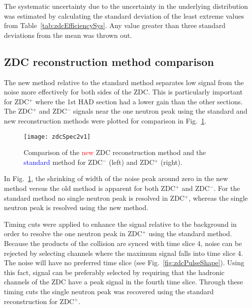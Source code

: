       The systematic uncertainty due to the uncertainty in the 
        underlying distribution was estimated by calculating the standard 
        deviation of the least extreme values from 
        Table~\ref{tab:zdcEfficiencySys}.
      Any value greater than three standard deviations from the mean was thrown
        out. 

    \subsection{ZDC reconstruction method comparison}
      The new method relative to the standard method separates low signal from 
        the noise more effectively for both sides of the ZDC.
      This is particularly important for ZDC$^{+}$ where the 1st HAD section
        had a lower gain than the other sections. 
      The ZDC$^{+}$ and ZDC$^{-}$ signals near the one neutron peak using the
        standard and new reconstruction methods were plotted for comparison in 
        Fig.~\ref{fig:zdcSpec2v1}.
      \begin{figure}[h]
        \centering
        \texttt{[image: zdcSpec2v1]}
        \caption{Comparison of the \textcolor{red}{new} ZDC reconstruction 
          method and the \textcolor{blue}{standard} method for ZDC$^{-}$ (left) and 
          ZDC$^{+}$ (right).}
        \label{fig:zdcSpec2v1}
      \end{figure}
      In Fig.~\ref{fig:zdcSpec2v1}, the shrinking of width of the noise peak 
        around zero in the new method versus the old method is apparent for
        both ZDC$^{+}$ and ZDC$^{-}$.
      For the standard method no single neutron peak is resolved in ZDC$^{+}$,
        whereas the single neutron peak is resolved using the new method. 

      Timing cuts were applied to enhance the signal relative to the background
        in order to resolve the one neutron peak in ZDC$^{+}$ using the 
        standard method. 
      Because the products of the collision are synced with time slice 4, noise
        can be rejected by selecting channels where the maximum signal falls 
        into time slice 4.
      The noise will have no preferred time slice (see Fig.~\ref{fig:zdcPulseShape}). 
      Using this fact, signal can be preferably selected by requiring that the
        hadronic channels of the ZDC have a peak signal in the fourth time 
        slice.
      Through these timing cuts the single neutron peak was recovered using the
       standard reconstruction for ZDC$^{+}$.

